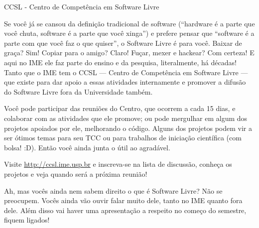 \begin{secao}{CCSL - Centro de Competência em Software Livre}

Se você já se cansou da definição tradicional de software (``hardware é a parte
que você chuta, software é a parte que você xinga'') e prefere pensar que
``software é a parte com que você faz o que quiser'', o Software Livre é para
você. Baixar de graça? Sim! Copiar para o amigo? Claro! Fuçar, mexer e hackear?
Com certeza! E aqui no IME ele faz parte do ensino e da pesquisa, literalmente,
há décadas! Tanto que o IME tem o CCSL --- Centro de Competência em Software
Livre --- que existe para dar apoio a essas atividades internamente e promover a
difusão do Software Livre fora da Universidade também.

Você pode participar das reuniões do Centro, que ocorrem a cada 15 dias, e
colaborar com as atividades que ele promove; ou pode mergulhar em algum dos
projetos apoiados por ele, melhorando o código. Alguns dos projetos podem vir a
ser ótimos temas para seu TCC ou para trabalhos de iniciação científica (com
bolsa! :D). Então você ainda junta o útil ao agradável.

Visite \url{http://ccsl.ime.usp.br} e inscreva-se na lista de discussão,
conheça os projetos e veja quando será a próxima reunião!

Ah, mas vocês ainda nem sabem direito o que é Software Livre? Não se preocupem.
Vocês ainda vão ouvir falar muito dele, tanto no IME quanto fora dele. Além
disso vai haver uma apresentação a respeito no começo do semestre, fiquem
ligados! %

\end{secao}
